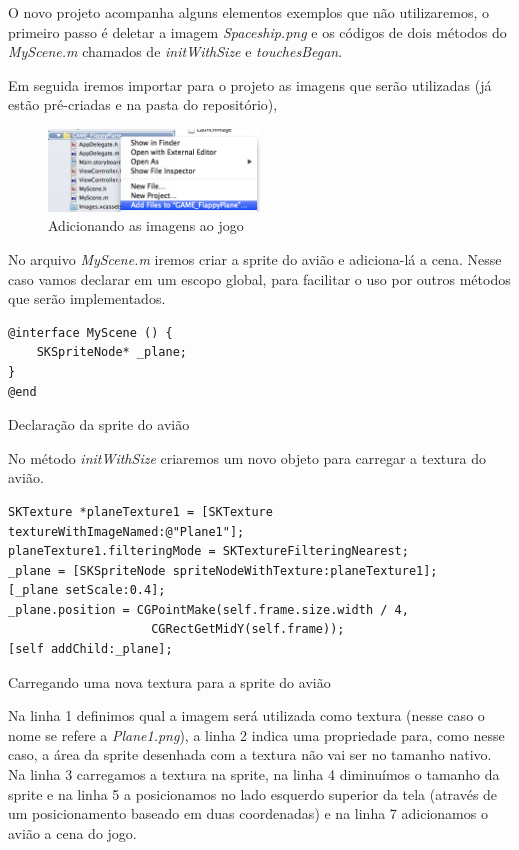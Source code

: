 \documentclass[a4paper,12pt,brazil,oneside]{book}
\begin{document}
O novo projeto acompanha alguns elementos exemplos que não utilizaremos, o primeiro passo é deletar a imagem \emph{Spaceship.png} e os códigos de dois métodos do \emph{MyScene.m} chamados de \emph{initWithSize} e \emph{touchesBegan}.

Em seguida iremos importar para o projeto as imagens que serão utilizadas (já estão pré-criadas e na pasta do repositório),

\begin{figure}[H]
  \centering
  \includegraphics[width=0.5\textwidth]{figuras/6/plane3.png}
  \caption{Adicionando as imagens ao jogo}
  \label{fig:a}
\end{figure}

No arquivo \emph{MyScene.m} iremos criar a sprite do avião e adiciona-lá a cena.
Nesse caso vamos declarar em um escopo global, para facilitar o uso por outros métodos que serão implementados.

\begin{listing}[H]
\begin{verbatim}
@interface MyScene () {
    SKSpriteNode* _plane;
}
@end
\end{verbatim}
\caption{Declaração da sprite do avião}
\end{listing}

No método \emph{initWithSize} criaremos um novo objeto para carregar a textura do avião.

\begin{listing}[H]
\begin{verbatim}
SKTexture *planeTexture1 = [SKTexture textureWithImageNamed:@"Plane1"];
planeTexture1.filteringMode = SKTextureFilteringNearest;
_plane = [SKSpriteNode spriteNodeWithTexture:planeTexture1];
[_plane setScale:0.4];
_plane.position = CGPointMake(self.frame.size.width / 4, 
					CGRectGetMidY(self.frame));
[self addChild:_plane];
\end{verbatim}
\caption{Carregando uma nova textura para a sprite do avião}
\end{listing}

Na linha 1 definimos qual a imagem será utilizada como textura (nesse caso o nome se refere a \emph{Plane1.png}), a linha 2 indica uma propriedade para, como nesse caso, a área da sprite desenhada com a textura não vai ser no tamanho nativo.
Na linha 3 carregamos a textura na sprite, na linha 4 diminuímos o tamanho da sprite e na linha 5 a posicionamos no lado esquerdo superior da tela (através de um posicionamento baseado em duas coordenadas) e na linha 7 adicionamos o avião a cena do jogo.
\end{document}
